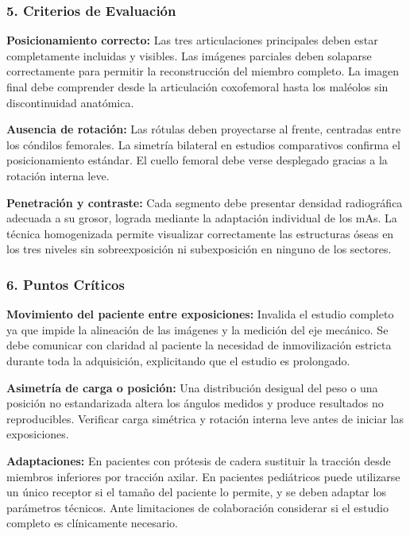 	\subsubsection*{5. Criterios de Evaluación}
	
	\textbf{Posicionamiento correcto:} Las tres articulaciones principales deben estar completamente incluidas y visibles. Las imágenes parciales deben solaparse correctamente para permitir la reconstrucción del miembro completo. La imagen final debe comprender desde la articulación coxofemoral hasta los maléolos sin discontinuidad anatómica.
	
	\textbf{Ausencia de rotación:} Las rótulas deben proyectarse al frente, centradas entre los cóndilos femorales. La simetría bilateral en estudios comparativos confirma el posicionamiento estándar. El cuello femoral debe verse desplegado gracias a la rotación interna leve.
	
	\textbf{Penetración y contraste:} Cada segmento debe presentar densidad radiográfica adecuada a su grosor, lograda mediante la adaptación individual de los mAs. La técnica homogenizada permite visualizar correctamente las estructuras óseas en los tres niveles sin sobreexposición ni subexposición en ninguno de los sectores.
	
	\subsubsection*{6. Puntos Críticos}
	
	\textbf{Movimiento del paciente entre exposiciones:} Invalida el estudio completo ya que impide la alineación de las imágenes y la medición del eje mecánico. Se debe comunicar con claridad al paciente la necesidad de inmovilización estricta durante toda la adquisición, explicitando que el estudio es prolongado.
	
	\textbf{Asimetría de carga o posición:} Una distribución desigual del peso o una posición no estandarizada altera los ángulos medidos y produce resultados no reproducibles. Verificar carga simétrica y rotación interna leve antes de iniciar las exposiciones.
	
	\textbf{Adaptaciones:} En pacientes con prótesis de cadera sustituir la tracción desde miembros inferiores por tracción axilar. En pacientes pediátricos puede utilizarse un único receptor si el tamaño del paciente lo permite, y se deben adaptar los parámetros técnicos. Ante limitaciones de colaboración considerar si el estudio completo es clínicamente necesario.
	

